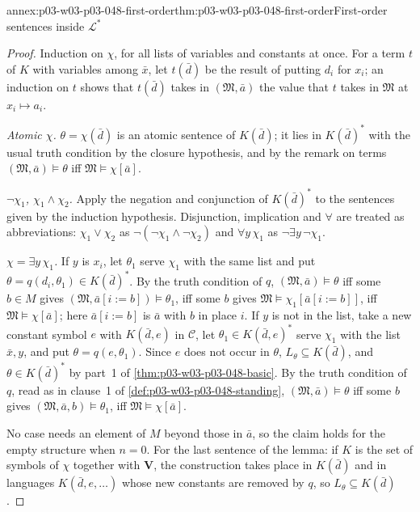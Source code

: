 \begin{annexitem}{annex:p03-w03-p03-048-first-order}{thm:p03-w03-p03-048-first-order}{First-order sentences inside \(\mathcal L^{\ast}\)}
\begin{proof}
Induction on \(\chi\), for all lists of variables and constants at once.
For a term \(t\) of \(K\) with variables among \(\bar x\), let \(t(\bar d)\)
be the result of putting \(d_i\) for \(x_i\); an induction on \(t\) shows that
\(t(\bar d)\) takes in \((\mathfrak M,\bar a)\) the value that \(t\) takes in
\(\mathfrak M\) at \(x_i\mapsto a_i\).

\emph{Atomic \(\chi\).}  \(\theta=\chi(\bar d)\) is an atomic sentence of
\(K(\bar d)\); it lies in \(K(\bar d)^{\ast}\) with the usual truth
condition by the closure hypothesis, and by the remark on terms
\((\mathfrak M,\bar a)\models\theta\) iff \(\mathfrak M\models\chi[\bar a]\).

\emph{\(\neg\chi_1\), \(\chi_1\land\chi_2\).}  Apply the negation and
conjunction of \(K(\bar d)^{\ast}\) to the sentences given by the induction
hypothesis.  Disjunction, implication and \(\forall\) are treated as
abbreviations: \(\chi_1\lor\chi_2\) as \(\neg(\neg\chi_1\land\neg\chi_2)\) and
\(\forall y\,\chi_1\) as \(\neg\exists y\,\neg\chi_1\).

\emph{\(\chi=\exists y\,\chi_1\).}  If \(y\) is \(x_i\), let \(\theta_1\)
serve \(\chi_1\) with the same list and put \(\theta=q(d_i,\theta_1)\in
K(\bar d)^{\ast}\).  By the truth condition of \(q\),
\((\mathfrak M,\bar a)\models\theta\) iff some \(b\in M\) gives
\((\mathfrak M,\bar a[i:=b])\models\theta_1\), iff some \(b\) gives
\(\mathfrak M\models\chi_1[\bar a[i:=b]]\), iff
\(\mathfrak M\models\chi[\bar a]\); here \(\bar a[i:=b]\) is \(\bar a\) with
\(b\) in place \(i\).  If \(y\) is not in the list, take a new constant
symbol \(e\) with \(K(\bar d,e)\) in \(\mathcal C\), let
\(\theta_1\in K(\bar d,e)^{\ast}\) serve \(\chi_1\) with the list
\(\bar x,y\), and put \(\theta=q(e,\theta_1)\).  Since \(e\) does not occur
in \(\theta\), \(L_\theta\subseteq K(\bar d)\), and \(\theta\in
K(\bar d)^{\ast}\) by part~1 of \cref{thm:p03-w03-p03-048-basic}.  By the
truth condition of \(q\), read as in clause~1 of
\cref{def:p03-w03-p03-048-standing}, \((\mathfrak M,\bar a)\models\theta\)
iff some \(b\) gives \((\mathfrak M,\bar a,b)\models\theta_1\), iff
\(\mathfrak M\models\chi[\bar a]\).

No case needs an element of \(M\) beyond those in \(\bar a\), so the claim
holds for the empty structure when \(n=0\).  For the last sentence of the
lemma: if \(K\) is the set of symbols of \(\chi\) together with \(\mathbf V\),
the construction takes place in \(K(\bar d)\) and in languages
\(K(\bar d,e,\ldots)\) whose new constants are removed by \(q\), so
\(L_\theta\subseteq K(\bar d)\).
\end{proof}
\end{annexitem}

